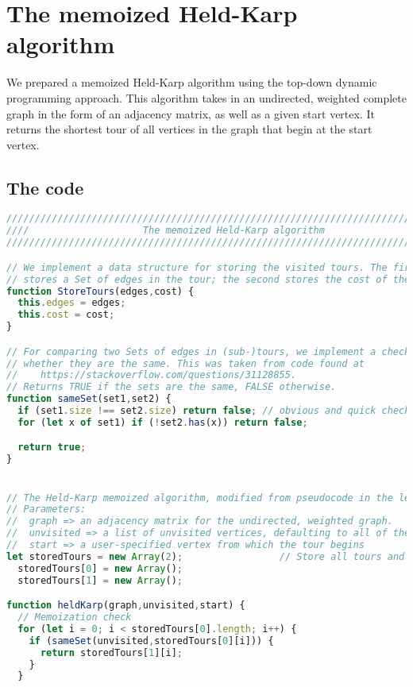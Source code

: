 \documentclass[10pt]{extarticle}
\begin{document}
\section{The memoized Held-Karp algorithm}
We prepared a memoized Held-Karp algorithm using the top-down dynamic
programming approach. This algorithm takes in an undirected, weighted complete
graph in the form of an adjacency matrix, as well as a given start vertex. It
returns the shortest tour of all vertices in the graph that begin at the start
vertex.

\subsection{The code}
\begin{lstlisting}[language=JavaScript]
///////////////////////////////////////////////////////////////////////////////
////                    The memoized Held-Karp algorithm                   ////
///////////////////////////////////////////////////////////////////////////////

// We implement a data structure for storing the visited tours. The first entry
// stores a Set of edges in the tour; the second stores the cost of the tour.
function StoreTours(edges,cost) {
  this.edges = edges;
  this.cost = cost;
}

// For comparing two Sets of edges in (sub-)tours, we implement a check to see
// whether they are the same. This was taken from code found at
//    https://stackoverflow.com/questions/31128855.
// Returns TRUE if the sets are the same, FALSE otherwise.
function sameSet(set1,set2) {
  if (set1.size !== set2.size) return false; // obvious and quick check
  for (let x of set1) if (!set2.has(x)) return false;

  return true;
}


// The Held-Karp memoized algorithm, modified from pseudocode in the lectures.
// Parameters:
//  graph => an adjacency matrix for the undirected, weighted graph.
//  unvisited => a list of unvisited vertices, defaulting to all of them
//  start => a user-specified vertex from which the tour begins
let storedTours = new Array(2);                 // Store all tours and sub-tours
  storedTours[0] = new Array();
  storedTours[1] = new Array();

function heldKarp(graph,unvisited,start) {
  // Memoization check
  for (let i = 0; i < storedTours[0].length; i++) {
    if (sameSet(unvisited,storedTours[0][i])) {
      return storedTours[1][i];
    }
  }


\end{lstlisting}
\end{document}

